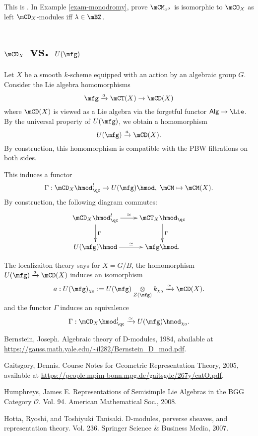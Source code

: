 	\begin{exe}
		This is . In Example \ref{exam-monodromy}, prove $\mCM_{x^\lambda}$ is isomorphic to $\mCO_X$ as left $\mCD_X$-modules iff $\lambda\in \mBZ$.
	\end{exe}
	

\section{\texorpdfstring{$\mCD_X$}{DX} vs. \texorpdfstring{$U(\mfg)$}{U(g)}}
	
	\begin{constr}
		Let $X$ be a smooth $k$-scheme equipped with an action by an algebraic group $G$. Consider the Lie algebra homomorphisms
		\[
			\mfg \xrightarrow{a} \mCT(X) \to \mCD(X)
		\]
		where $\mCD(X)$ is viewed as a Lie algebra via the forgetful functor $\mathsf{Alg} \to \Lie$. By the universal property of $U(\mfg)$, we obtain a homomorphism
		\[
			U(\mfg) \xrightarrow{a}  \mCD(X).
		\]
		By construction, this homomorphism is compatible with the PBW filtrations on both sides.

		This induces a functor
		\[
			\Gamma: \mCD_X\hmod^l_\qc \to U(\mfg)\hmod, \; \mCM \mapsto \mCM(X).
		\]
		By construction, the following diagram commutes:
		\[
			\xymatrix{
				\mCD_X\hmod^l_\qc \ar[r]^-\simeq \ar[d]^-\Gamma&
				\mCT_X\hmod_\qc \ar[d]^-\Gamma \\
				U(\mfg)\hmod \ar[r]^-\simeq & \mfg\hmod.
			}
		\]
	\end{constr}

	\begin{rem}
		The localizaiton theory says for $X=G/B$, the homomorphism $U(\mfg) \xrightarrow{a}  \mCD(X)$ induces an isomorphism
		\[
			a: U(\mfg)_{\chi_0}:= U(\mfg)\ot_{Z(\mfg)} k_{\chi_0} \xrightarrow{\simeq}\mCD(X).
		\]
		and the functor $\Gamma$ induces an equivalence
		\[
			\Gamma: \mCD_X\hmod^l_\qc \xrightarrow{\simeq} U(\mfg)\hmod_{\chi_0}.
		\]
	\end{rem}

	
	




\begin{thebibliography}{Yau}

	 Bernstein, Joseph. Algebraic theory of D-modules, 1984, abailable at \url{https://gauss.math.yale.edu/~il282/Bernstein_D_mod.pdf}.

	 Gaitsgory, Dennis. Course Notes for Geometric Representation Theory, 2005, available at \url{https://people.mpim-bonn.mpg.de/gaitsgde/267y/catO.pdf}.

	 Humphreys, James E. Representations of Semisimple Lie Algebras in the BGG Category $\mathcal{O} $. Vol. 94. American Mathematical Soc., 2008.

	 Hotta, Ryoshi, and Toshiyuki Tanisaki. D-modules, perverse sheaves, and representation theory. Vol. 236. Springer Science \& Business Media, 2007.
\end{thebibliography}


 



